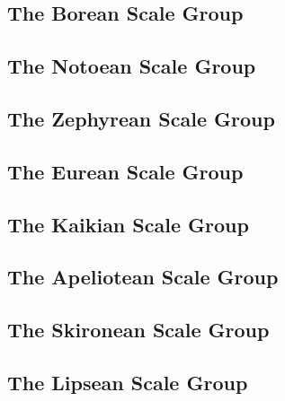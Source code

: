 \documentclass[english]{./gbook}
\begin{document}
\begin{large}
\subsection{The Borean Scale Group}
\subsection{The Notoean Scale Group}
\subsection{The Zephyrean Scale Group}
\subsection{The Eurean Scale Group}
\subsection{The Kaikian Scale Group}
\subsection{The Apeliotean Scale Group}
\subsection{The Skironean Scale Group}
\subsection{The Lipsean Scale Group}




\end{large}
\end{document}
